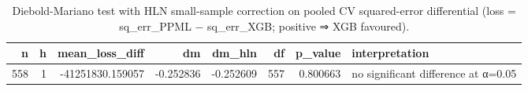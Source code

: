 \begin{table}
\caption{Diebold-Mariano test with HLN small-sample correction on pooled CV squared-error differential (loss = sq\_err\_PPML − sq\_err\_XGB; positive ⇒ XGB favoured).}
\label{tbl:ch4-dm-test}
\begin{tabular}{rrrrrrrl}
\toprule
n & h & mean\_loss\_diff & dm & dm\_hln & df & p\_value & interpretation \\
\midrule
558 & 1 & -41251830.159057 & -0.252836 & -0.252609 & 557 & 0.800663 & no significant difference at α=0.05 \\
\bottomrule
\end{tabular}
\end{table}
